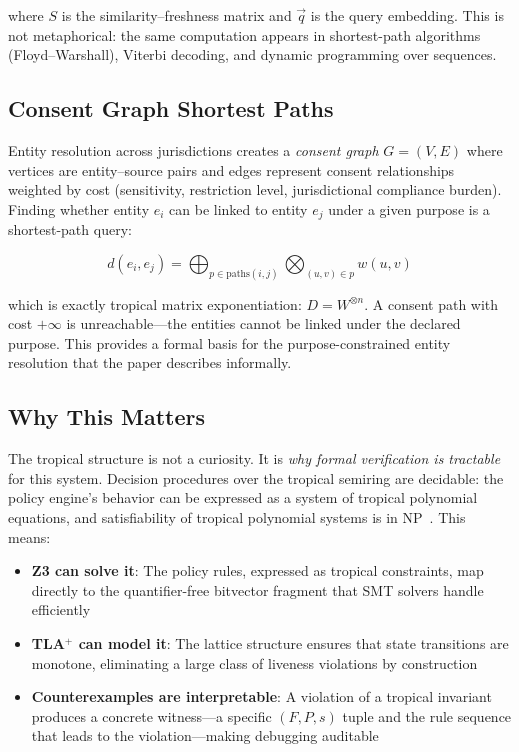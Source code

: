 \documentclass[11pt,twocolumn]{article}
\begin{document}
where $S$ is the similarity--freshness matrix and $\vec{q}$ is the query embedding. This is not metaphorical: the same computation appears in shortest-path algorithms (Floyd--Warshall), Viterbi decoding, and dynamic programming over sequences.

\subsection{Consent Graph Shortest Paths}

Entity resolution across jurisdictions creates a \emph{consent graph} $G = (V, E)$ where vertices are entity--source pairs and edges represent consent relationships weighted by cost (sensitivity, restriction level, jurisdictional compliance burden). Finding whether entity $e_i$ can be linked to entity $e_j$ under a given purpose is a shortest-path query:

\begin{equation}
d(e_i, e_j) = \bigoplus_{p \in \text{paths}(i,j)} \bigotimes_{(u,v) \in p} w(u,v)
\end{equation}

which is exactly tropical matrix exponentiation: $D = W^{\otimes n}$. A consent path with cost $+\infty$ is unreachable---the entities cannot be linked under the declared purpose. This provides a formal basis for the purpose-constrained entity resolution that the paper describes informally.

\subsection{Why This Matters}

The tropical structure is not a curiosity. It is \emph{why formal verification is tractable} for this system. Decision procedures over the tropical semiring are decidable: the policy engine's behavior can be expressed as a system of tropical polynomial equations, and satisfiability of tropical polynomial systems is in NP~\cite{maclagan2015}. This means:

\begin{itemize}[nosep,leftmargin=1.2em]
  \item \textbf{Z3 can solve it}: The policy rules, expressed as tropical constraints, map directly to the quantifier-free bitvector fragment that SMT solvers handle efficiently
  \item \textbf{TLA$^+$ can model it}: The lattice structure ensures that state transitions are monotone, eliminating a large class of liveness violations by construction
  \item \textbf{Counterexamples are interpretable}: A violation of a tropical invariant produces a concrete witness---a specific $(F, P, s)$ tuple and the rule sequence that leads to the violation---making debugging auditable
\end{itemize}
\end{document}
